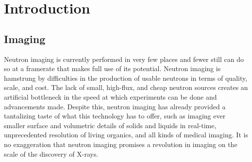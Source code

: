 \label{sec:introduction}
\section{Introduction}

\subsection{Imaging}

Neutron imaging is currently performed in very few places and fewer still can do so at a framerate that makes full use of its potential. Neutron imaging is hamstrung by difficulties in the production of usable neutrons in terms of quality, scale, and cost. The lack of small, high-flux, and cheap neutron sources creates an artificial bottleneck in the speed at which experiments can be done and advancements made. Despite this, neutron imaging has already provided a tantalizing taste of what this technology has to offer, such as imaging ever smaller surface and volumetric details of solids and liquids in real-time, unprecedented resolution of living organics, and all kinds of medical imaging. It is no exaggeration that neutron imaging promises a revolution in imaging on the scale of the discovery of X-rays.\\

